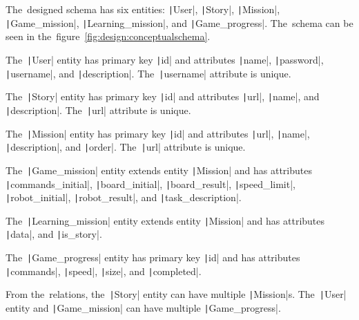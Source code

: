 The~designed schema has six entities: \texttt|User|, \texttt|Story|, \texttt|Mission|, \linebreak\texttt|Game_mission|, \texttt|Learning_mission|, and \texttt|Game_progress|.
The~schema can be seen in the~figure~\ref{fig:design:conceptualschema}.

The~\texttt|User| entity has primary key \texttt|id| and attributes \texttt|name|, \linebreak\texttt|password|, \texttt|username|, and \texttt|description|.
The~\texttt|username| attribute is unique.

The~\texttt|Story| entity has primary key \texttt|id| and attributes \texttt|url|, \texttt|name|, and \texttt|description|.
The~\texttt|url| attribute is unique.

The~\texttt|Mission| entity has primary key \texttt|id| and attributes \texttt|url|, \texttt|name|, \linebreak\texttt|description|, and \texttt|order|.
The~\texttt|url| attribute is unique.

The~\texttt|Game_mission| entity extends entity \texttt|Mission| and has attributes \linebreak\texttt|commands_initial|, \texttt|board_initial|, \texttt|board_result|, \texttt|speed_limit|, \linebreak\texttt|robot_initial|, \texttt|robot_result|, and \texttt|task_description|.

The~\texttt|Learning_mission| entity extends entity \texttt|Mission| and has attributes \texttt|data|, and \texttt|is_story|.

The~\texttt|Game_progress| entity has primary key \texttt|id| and has attributes \texttt|commands|, \texttt|speed|, \texttt|size|, and \texttt|completed|.

From the~relations, the~\texttt|Story| entity can have multiple \texttt|Mission|s.
The~\texttt|User| entity and \texttt|Game_mission| can have multiple \texttt|Game_progress|.

